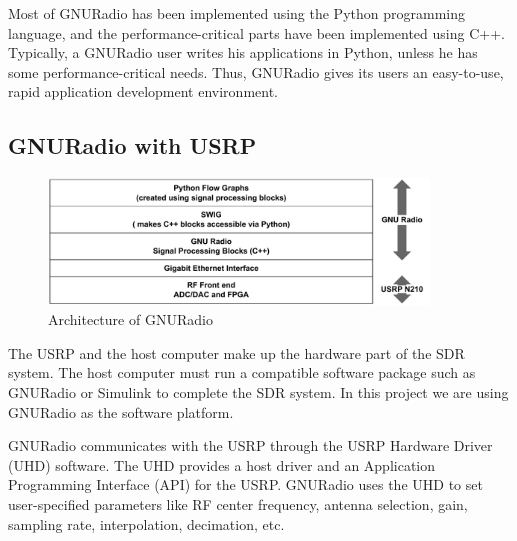 Most of GNURadio has been implemented using the Python programming language,
and the performance-critical parts have been implemented using C++. Typically,
a GNURadio user writes his applications in Python, unless he has some
performance-critical needs. Thus, GNURadio gives its users an easy-to-use,
rapid application development environment.

\subsection{GNURadio with USRP}

\begin{figure}
\centering
\includegraphics[width=0.9\textwidth]{../images/gnuradio_architecture}
\caption{Architecture of GNURadio}
\label{gnuradio_architecture}
\end{figure}

The USRP and the host computer make up the hardware part of the SDR system. 
The host computer must run a compatible software package such as GNURadio or
Simulink to complete the SDR system. In this project we are using GNURadio
as the software platform.

GNURadio communicates with the USRP through the USRP Hardware Driver (UHD)
software. The UHD provides a host driver and an Application Programming
Interface (API) for the USRP. GNURadio uses the UHD to set user-specified
parameters like RF center frequency, antenna selection, gain, sampling rate,
interpolation, decimation, etc.

